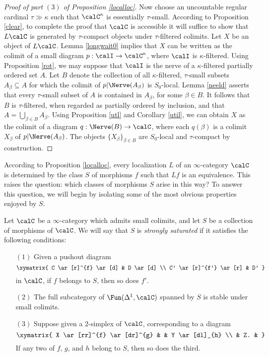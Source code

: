 \begin{proof}[Proof of part $(3)$ of Proposition \ref{localloc}]
Now choose an uncountable regular cardinal $\tau \gg \kappa$ such that $\calC^{\kappa}$ is essentially $\tau$-small. According to Proposition \ref{clear}, to complete the proof that $\calC$ is accessible it will suffice to show that $L \calC$ is generated by $\tau$-compact objects under $\tau$-filtered colimits. Let $X$ be an object of $L \calC$. Lemma \ref{longwait0} implies
that $X$ can be written as the colimit of a small diagram $p: \calI \rightarrow \calC^{\kappa}$,
where $\calI$ is $\kappa$-filtered. Using Proposition \ref{rot}, we may suppose that
$\calI$ is the nerve of a $\kappa$-filtered partially ordered set $A$. Let $B$ denote the
collection of all $\kappa$-filtered, $\tau$-small subsets $A_{\beta} \subseteq A$ for which
the colimit of $p| \Nerve(A_{\beta})$ is $S_0$-local. Lemma \ref{neeld} asserts that every $\tau$-small subset of $A$ is contained in $A_{\beta}$, for some $\beta \in B$. It follows that
$B$ is $\tau$-filtered, when regarded as partially ordered by inclusion, and that
$A = \bigcup_{\beta \in B} A_{\beta}$. Using Proposition \ref{utl} and Corollary \ref{util}, we can
obtain $X$ as the colimit of a diagram $q: \Nerve(B) \rightarrow \calC$, where each
$q(\beta)$ is a colimit $X_{\beta}$ of $p | \Nerve(A_{\beta})$. The objects $\{ X_{\beta} \}_{\beta \in B}$ are $S_0$-local and $\tau$-compact by construction.
\end{proof}

According to Proposition \ref{localloc}, every localization $L$ of an $\infty$-category $\calC$ is determined by the class $S$ of morphisms $f$ such that $Lf$ is an equivalence. This raises the question: which classes of morphisms $S$ arise in this way? To answer this question, we will begin by isolating some of the most obvious properties enjoyed by $S$.

\begin{definition}\label{saturated2}
Let $\calC$ be a $\infty$-category which admits small colimits, and let $S$ be a collection of morphisms of $\calC$. We will say that $S$ is {\it strongly saturated} if it satisfies the following conditions:

\begin{itemize}
\item[$(1)$] Given a pushout diagram 
$$ \xymatrix{ C \ar[r]^{f} \ar[d] & D \ar[d] \\
C' \ar[r]^{f'} \ar[r] & D' }$$
in $\calC$, if $f$ belongs to $S$, then so does $f'$.

\item[$(2)$] The full subcategory of $\Fun(\Delta^1, \calC)$ spanned by $S$ is stable under small  colimits.

\item[$(3)$] Suppose given a $2$-simplex of $\calC$, corresponding to a diagram
$$ \xymatrix{ X \ar[rr]^{f} \ar[dr]^{g} & & Y \ar[dl]_{h} \\
& Z. & }$$
If any two of $f$, $g$, and $h$ belong to $S$, then so does the third.
\end{itemize}
\end{definition}

